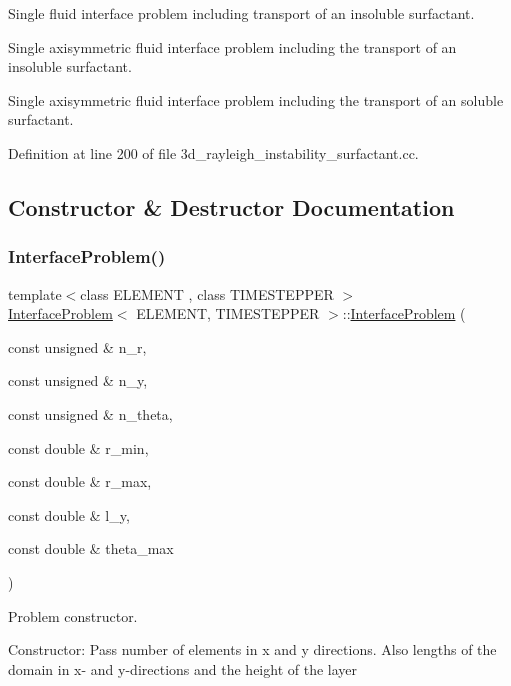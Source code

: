 Single fluid interface problem including transport of an insoluble surfactant.

Single axisymmetric fluid interface problem including the transport of an insoluble surfactant.

Single axisymmetric fluid interface problem including the transport of an soluble surfactant. 

Definition at line 200 of file 3d\+\_\+rayleigh\+\_\+instability\+\_\+surfactant.\+cc.



\subsection{Constructor \& Destructor Documentation}
\mbox{\label{classInterfaceProblem_a2ecc265740dba1626344fc090fad5fa6}} 
\subsubsection{\texorpdfstring{Interface\+Problem()}{InterfaceProblem()}\hspace{0.1cm}{\footnotesize\ttfamily [1/3]}}
{\footnotesize\ttfamily template$<$class E\+L\+E\+M\+E\+NT , class T\+I\+M\+E\+S\+T\+E\+P\+P\+ER $>$ \\
\hyperlink{classInterfaceProblem}{Interface\+Problem}$<$ E\+L\+E\+M\+E\+NT, T\+I\+M\+E\+S\+T\+E\+P\+P\+ER $>$\+::\hyperlink{classInterfaceProblem}{Interface\+Problem} (\begin{DoxyParamCaption}\item[{const unsigned \&}]{n\+\_\+r,  }\item[{const unsigned \&}]{n\+\_\+y,  }\item[{const unsigned \&}]{n\+\_\+theta,  }\item[{const double \&}]{r\+\_\+min,  }\item[{const double \&}]{r\+\_\+max,  }\item[{const double \&}]{l\+\_\+y,  }\item[{const double \&}]{theta\+\_\+max }\end{DoxyParamCaption})}



Problem constructor. 

Constructor\+: Pass number of elements in x and y directions. Also lengths of the domain in x-\/ and y-\/directions and the height of the layer 

